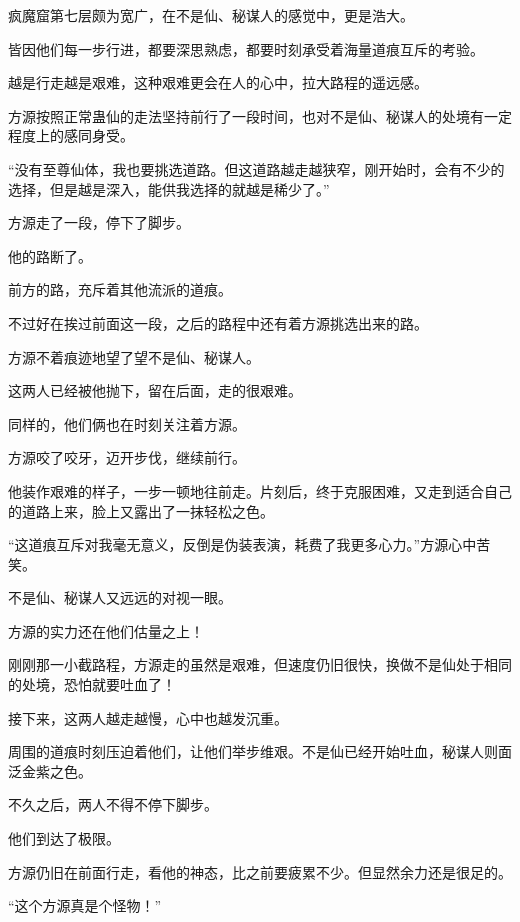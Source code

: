 
\begin{this_body}



疯魔窟第七层颇为宽广，在不是仙、秘谋人的感觉中，更是浩大。

皆因他们每一步行进，都要深思熟虑，都要时刻承受着海量道痕互斥的考验。

越是行走越是艰难，这种艰难更会在人的心中，拉大路程的遥远感。

方源按照正常蛊仙的走法坚持前行了一段时间，也对不是仙、秘谋人的处境有一定程度上的感同身受。

“没有至尊仙体，我也要挑选道路。但这道路越走越狭窄，刚开始时，会有不少的选择，但是越是深入，能供我选择的就越是稀少了。”

方源走了一段，停下了脚步。

他的路断了。

前方的路，充斥着其他流派的道痕。

不过好在挨过前面这一段，之后的路程中还有着方源挑选出来的路。

方源不着痕迹地望了望不是仙、秘谋人。

这两人已经被他抛下，留在后面，走的很艰难。

同样的，他们俩也在时刻关注着方源。

方源咬了咬牙，迈开步伐，继续前行。

他装作艰难的样子，一步一顿地往前走。片刻后，终于克服困难，又走到适合自己的道路上来，脸上又露出了一抹轻松之色。

“这道痕互斥对我毫无意义，反倒是伪装表演，耗费了我更多心力。”方源心中苦笑。

不是仙、秘谋人又远远的对视一眼。

方源的实力还在他们估量之上！

刚刚那一小截路程，方源走的虽然是艰难，但速度仍旧很快，换做不是仙处于相同的处境，恐怕就要吐血了！

接下来，这两人越走越慢，心中也越发沉重。

周围的道痕时刻压迫着他们，让他们举步维艰。不是仙已经开始吐血，秘谋人则面泛金紫之色。

不久之后，两人不得不停下脚步。

他们到达了极限。

方源仍旧在前面行走，看他的神态，比之前要疲累不少。但显然余力还是很足的。

“这个方源真是个怪物！”


\end{this_body}
